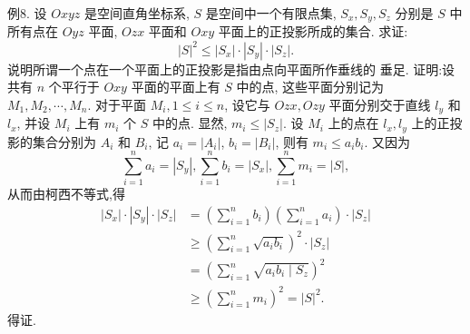 例8. 设 $O x y z$ 是空间直角坐标系, $S$ 是空间中一个有限点集, $S_x, S_y, S_z$ 分别是 $S$ 中所有点在 $O y z$ 平面, $O z x$ 平面和 $O x y$ 平面上的正投影所成的集合.
求证:
$$
|S|^2 \leqslant\left|S_x\right| \cdot\left|S_y\right| \cdot\left|S_z\right| .
$$
说明所谓一个点在一个平面上的正投影是指由点向平面所作垂线的 垂足.
证明:设共有 $n$ 个平行于 $O x y$ 平面的平面上有 $S$ 中的点, 这些平面分别记为 $M_1, M_2, \cdots, M_n$. 对于平面 $M_i, 1 \leqslant i \leqslant n$, 设它与 $O z x, O z y$ 平面分别交于直线 $l_y$ 和 $l_x$, 并设 $M_i$ 上有 $m_i$ 个 $S$ 中的点.
显然, $m_i \leqslant\left|S_z\right|$.
设 $M_i$ 上的点在 $l_x, l_y$ 上的正投影的集合分别为 $A_i$ 和 $B_i$, 记 $a_i=\left|A_i\right|$, $b_i=\left|B_i\right|$, 则有 $m_i \leqslant a_i b_i$. 又因为
$$
\sum_{i=1}^n a_i=\left|S_y\right|, \sum_{i=1}^n b_i=\left|S_x\right|, \sum_{i=1}^n m_i=|S|,
$$
从而由柯西不等式,得
$$
\begin{aligned}
\left|S_x\right| \cdot\left|S_y\right| \cdot\left|S_z\right| & =\left(\sum_{i=1}^n b_i\right)\left(\sum_{i=1}^n a_i\right) \cdot\left|S_z\right| \\
& \geqslant\left(\sum_{i=1}^n \sqrt{a_i b_i}\right)^2 \cdot\left|S_z\right| \\
& =\left(\sum_{i=1}^n \sqrt{a_i b_i \mid S_z}\right)^2 \\
& \geqslant\left(\sum_{i=1}^n m_i\right)^2=|S|^2 .
\end{aligned}
$$
得证.



